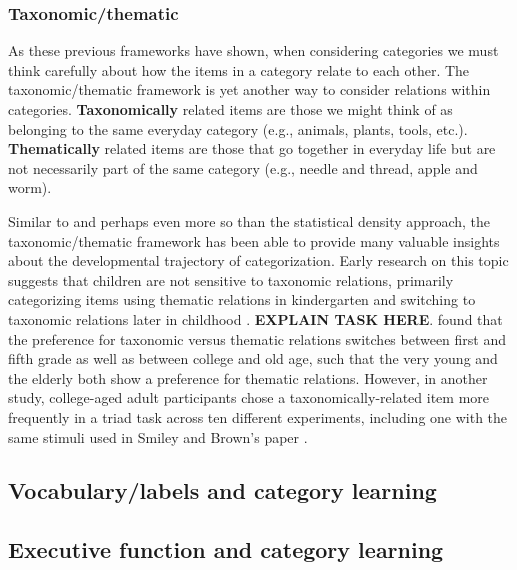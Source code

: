 \documentclass[../dissertation.tex]{subfiles}
\begin{document}
\subsubsection{Taxonomic/thematic}
	As these previous frameworks have shown, when considering categories we must think carefully about how the items in a category relate to each other. The taxonomic/thematic framework is yet another way to consider relations within categories. \textbf{Taxonomically} related items are those we might think of as belonging to the same everyday category (e.g., animals, plants, tools, etc.). \textbf{Thematically} related items are those that go together in everyday life but are not necessarily part of the same category (e.g., needle and thread, apple and worm).  \par
		Similar to and perhaps even more so than the statistical density approach, the taxonomic/thematic framework has been able to provide many valuable insights about the developmental trajectory of categorization. Early research on this topic suggests that children are not sensitive to taxonomic relations, primarily categorizing items using thematic relations in kindergarten and switching to taxonomic relations later in childhood \citep{vygotsky1962language,piaget1964early}. \textbf{EXPLAIN TASK HERE}. \citet{Smiley1979} found that the preference for taxonomic versus thematic relations switches between first and fifth grade as well as between college and old age, such that the very young and the elderly both show a preference for thematic relations. However, in another study, college-aged adult participants chose a taxonomically-related item more frequently in a triad task across ten different experiments, including one with the same stimuli used in Smiley and Brown's paper \citep{Lin2001}.
		
\subsection{Vocabulary/labels and category learning}

\subsection{Executive function and category learning}
\end{document}
